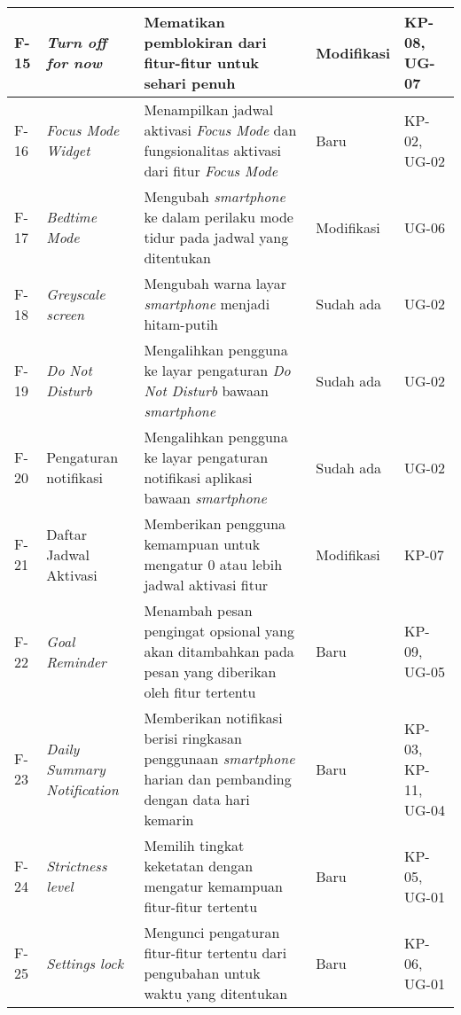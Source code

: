\begin{small}
\begin{longtable}[c]{|W{c}{0.06\textwidth}|>{\cccnormspacingcenter}m{0.15\textwidth}|>{\cccnormspacing}m{0.35\textwidth}|>{\cccnormspacingcenter}m{0.12\textwidth}|>{\cccnormspacingcenter}m{0.16\textwidth}|}
  F-15 & \textit{Turn off for now} & Mematikan pemblokiran dari fitur-fitur untuk sehari penuh & Modifikasi & KP-08, UG-07 \\ \hline
  F-16 & \textit{Focus Mode Widget} & Menampilkan jadwal aktivasi \textit{Focus Mode} dan fungsionalitas aktivasi dari fitur \textit{Focus Mode} & Baru & KP-02, UG-02 \\ \hline
  F-17 & \textit{Bedtime Mode} & Mengubah \textit{smartphone} ke dalam perilaku mode tidur pada jadwal yang ditentukan & Modifikasi & UG-06 \\ \hline
  F-18 & \textit{Greyscale screen} & Mengubah warna layar \textit{smartphone} menjadi hitam-putih & Sudah ada & UG-02 \\ \hline
  F-19 & \textit{Do Not Disturb} & Mengalihkan pengguna ke layar pengaturan \textit{Do Not Disturb} bawaan \textit{smartphone} & Sudah ada & UG-02 \\ \hline
  F-20 & Pengaturan notifikasi & Mengalihkan pengguna ke layar pengaturan notifikasi aplikasi bawaan \textit{smartphone} & Sudah ada & UG-02 \\ \hline
  F-21 & Daftar Jadwal Aktivasi & Memberikan pengguna kemampuan untuk mengatur 0 atau lebih jadwal aktivasi fitur & Modifikasi & KP-07 \\ \hline
  F-22 & \textit{Goal Reminder} & Menambah pesan pengingat opsional yang akan ditambahkan pada pesan yang diberikan oleh fitur tertentu & Baru & KP-09, UG-05 \\ \hline
  F-23 & \textit{Daily Summary Notification} & Memberikan notifikasi berisi ringkasan penggunaan \textit{smartphone} harian dan pembanding dengan data hari kemarin & Baru & KP-03, KP-11, UG-04 \\ \hline
  F-24 & \textit{Strictness level} & Memilih tingkat keketatan dengan mengatur kemampuan fitur-fitur tertentu & Baru & KP-05, UG-01 \\ \hline
  F-25 & \textit{Settings lock} & Mengunci pengaturan fitur-fitur tertentu dari pengubahan untuk waktu yang ditentukan & Baru & KP-06, UG-01 \\ \hline

\end{longtable}
\end{small}
\justifying
\FloatBarrier

